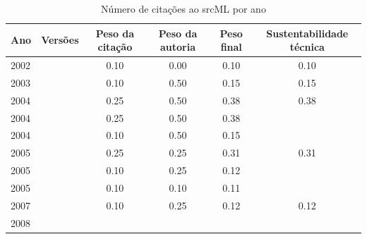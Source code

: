\begin{table}[H]
\caption{Número de citações ao srcML por ano}
\centering
\begin{tabular}{| l | c | c | c | c | c |}
  \hline
  Ano & Versões & Peso da citação & Peso da autoria & Peso final & Sustentabilidade técnica \\
  \hline
            2002
          &
          
          &
          0.10
          &
          0.00
          &
          0.10
          &
            {\color{red} 0.10}
          \\
\hline
            2003
          &
          
          &
          0.10
          &
          0.50
          &
          0.15
          &
            {\color{red} 0.15}
          \\
\hline
            2004
          &
          
          &
          0.25
          &
          0.50
          &
          0.38
          &
            {\color{red} 0.38}
          \\
            2004
          &
          
          &
          0.25
          &
          0.50
          &
          0.38
          &
          \\
            2004
          &
          
          &
          0.10
          &
          0.50
          &
          0.15
          &
          \\
\hline
            2005
          &
          
          &
          0.25
          &
          0.25
          &
          0.31
          &
            {\color{red} 0.31}
          \\
            2005
          &
          
          &
          0.10
          &
          0.25
          &
          0.12
          &
          \\
            2005
          &
          
          &
          0.10
          &
          0.10
          &
          0.11
          &
          \\
\hline
            2007
          &
          
          &
          0.10
          &
          0.25
          &
          0.12
          &
            {\color{red} 0.12}
          \\
\hline
            2008
          &
          

\end{tabular}
\end{table}
